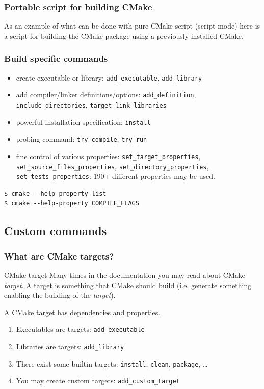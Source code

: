 \documentclass[compress,slidestop,table
              ]
               {beamer}
\newcommand{\fname}[1]{\texttt{#1}}
\begin{document}
\begin{frame}
\frametitle{Portable script for building CMake}
As an example of what can be done with pure CMake script
(script mode) here is a script for building the CMake package
using a previously installed CMake.


\end{frame}

\begin{frame}[fragile]
\frametitle{Build specific commands}
\begin{itemize}
\item create executable or library: \lstinline!add_executable!, \lstinline!add_library!
\item add compiler/linker definitions/options: \lstinline!add_definition!, \lstinline!include_directories!,
      \lstinline!target_link_libraries!
\item powerful installation specification: \lstinline!install!
\item probing command: \lstinline!try_compile!, \lstinline!try_run!
\item fine control of various properties:
      \lstinline!set_target_properties!,
      \lstinline!set_source_files_properties!,
      \lstinline!set_directory_properties!,
      \lstinline!set_tests_properties!: \alert{190+} different properties may be used.
\end{itemize}
\begin{Verbatim}
$ cmake --help-property-list
$ cmake --help-property COMPILE_FLAGS
\end{Verbatim}
\end{frame}

\subsection{Custom commands}
\begin{frame}[fragile]
\frametitle{What are CMake targets?}
\begin{block}{CMake target}
Many times in the documentation you may read about CMake \emph{target}.
A target is something that CMake should build (i.e. generate something
enabling the building of the \emph{target}).

A CMake target has \alert{dependencies} and \alert{properties}.
\end{block}
\begin{enumerate}
\item Executables are targets: \lstinline!add_executable!
\item Libraries are targets: \lstinline!add_library!
\item There exist some builtin targets: \fname{install}, \fname{clean}, \fname{package}, \ldots
\item You may create custom targets: \lstinline!add_custom_target!
\end{enumerate}
\end{frame}
\end{document}
